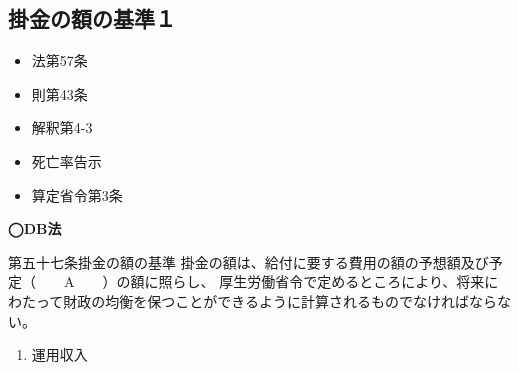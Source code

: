 \newpage

\subsection{掛金の額の基準１}



\begin{InyouJobunbox}
  \begin{itemize}
    \item 法第57条
    \item 則第43条
    \item 解釈第4-3
    \item 死亡率告示
    \item 算定省令第3条
  \end{itemize}
\end{InyouJobunbox}


\begin{fillblank}[数理人試験 H26 問題1(3)g]
  \noindent \textbf{◯DB法}
  \begin{lawstructure}
    \begin{lawarticle}{第五十七条}{掛金の額の基準}
      掛金の額は、給付に要する費用の額の予想額及び予定（　　A　　）の額に照らし、
      厚生労働省令で定めるところにより、将来にわたって財政の均衡を保つことができるように計算されるものでなければならない。
    \end{lawarticle}
  \end{lawstructure}
\end{fillblank}

\begin{answerbox}
    \begin{enumerate}[A: ]
    \item 運用収入
  \end{enumerate}
\end{answerbox}


